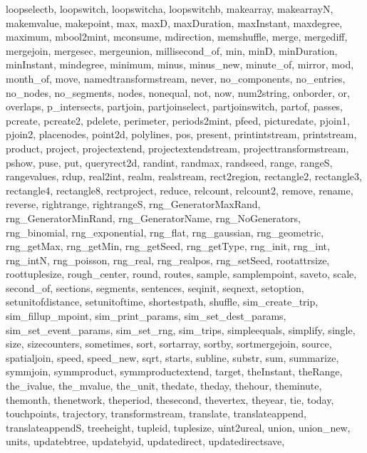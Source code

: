 {{        loopselectb, loopswitch, loopswitcha, loopswitchb, makearray, makearrayN, makemvalue, makepoint, 
        max, maxD, maxDuration, maxInstant, maxdegree, maximum, mbool2mint, mconsume, mdirection, 
        memshuffle, merge, mergediff, mergejoin, mergesec, mergeunion, millisecond\_of, min, minD, 
        minDuration, minInstant, mindegree, minimum, minus, minus\_new, minute\_of, mirror, mod, 
        month\_of, move, namedtransformstream, never, no\_components, no\_entries, no\_nodes, 
        no\_segments, nodes, nonequal, not, now, num2string, onborder, or, overlaps, p\_intersects, 
        partjoin, partjoinselect, partjoinswitch, partof, passes, pcreate, pcreate2, pdelete, 
        perimeter, periods2mint, pfeed, picturedate, pjoin1, pjoin2, placenodes, point2d, polylines, 
        pos, present, printintstream, printstream, product, project, projectextend, projectextendstream, 
        projecttransformstream, pshow, puse, put, queryrect2d, randint, randmax, randseed, range, 
        rangeS, rangevalues, rdup, real2int, realm, realstream, rect2region, rectangle2, rectangle3, 
        rectangle4, rectangle8, rectproject, reduce, relcount, relcount2, remove, rename, reverse, 
        rightrange, rightrangeS, rng\_GeneratorMaxRand, rng\_GeneratorMinRand, rng\_GeneratorName, 
        rng\_NoGenerators, rng\_binomial, rng\_exponential, rng\_flat, rng\_gaussian, rng\_geometric, 
        rng\_getMax, rng\_getMin, rng\_getSeed, rng\_getType, rng\_init, rng\_int, rng\_intN, 
        rng\_poisson, rng\_real, rng\_realpos, rng\_setSeed, rootattrsize, roottuplesize, 
        rough\_center, round, routes, sample, samplempoint, saveto, scale, second\_of, sections, 
        segments, sentences, seqinit, seqnext, setoption, setunitofdistance, setunitoftime, 
        shortestpath, shuffle, sim\_create\_trip, sim\_fillup\_mpoint, sim\_print\_params, 
        sim\_set\_dest\_params, sim\_set\_event\_params, sim\_set\_rng, sim\_trips, simpleequals, 
        simplify, single, size, sizecounters, sometimes, sort, sortarray, sortby, sortmergejoin, 
        source, spatialjoin, speed, speed\_new, sqrt, starts, subline, substr, sum, summarize, 
        symmjoin, symmproduct, symmproductextend, target, theInstant, theRange, the\_ivalue, 
        the\_mvalue, the\_unit, thedate, theday, thehour, theminute, themonth, thenetwork, theperiod, 
        thesecond, thevertex, theyear, tie, today, touchpoints, trajectory, transformstream, 
        translate, translateappend, translateappendS, treeheight, tupleid, tuplesize, 
        uint2ureal, union, union\_new, units, updatebtree, updatebyid, updatedirect, updatedirectsave, 
}}
